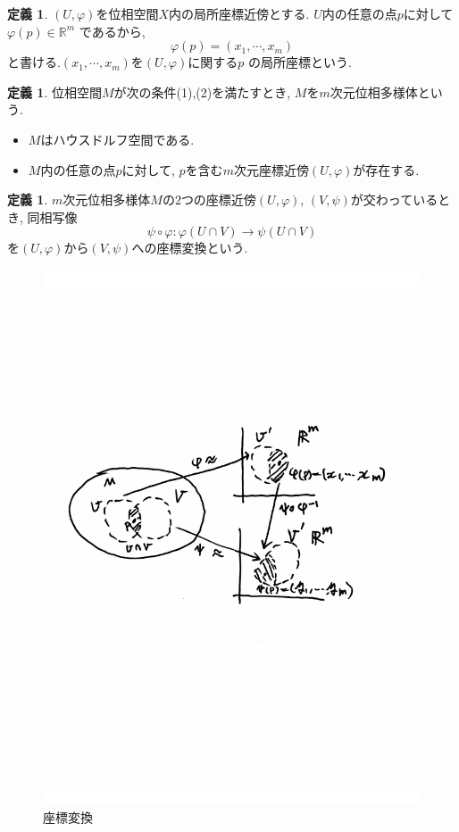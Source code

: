 \documentclass[a4j,12pt]{jarticle}
\theoremstyle{definition}
\newtheorem{definition}[theorem]{定義}
\begin{document}
\begin{definition}
    $(U, \varphi)$を位相空間$X$内の局所座標近傍とする.
    $U$内の任意の点$p$に対して$\varphi(p) \in \mathbb{R}^m$
    であるから, 
    $$\varphi(p)=(x_1, \cdots ,x_m)$$
    と書ける.$(x_1, \cdots ,x_m)$を$(U, \varphi)$に関する$p$
    の局所座標という.
\end{definition}
\begin{definition}
    位相空間$M$が次の条件(1),(2)を満たすとき, 
    $M$を$m$次元位相多様体という. 
    \begin{itemize}
        \item[(1)]$M$はハウスドルフ空間である.
        \item[(2)]$M$内の任意の点$p$に対して, 
        $p$を含む$m$次元座標近傍$(U,\varphi)$が存在する.
    \end{itemize}
\end{definition}
\begin{definition}
    $m$次元位相多様体$M$の$2$つの座標近傍$(U, \varphi)$, 
    $(V, \psi)$が交わっているとき, 同相写像
    $$\psi \circ \varphi:\varphi(U\cap V)\rightarrow \psi(U\cap V)$$
    を$(U, \varphi)$から$(V, \psi)$への座標変換という. 
\end{definition}
\begin{figure}[H]
    \centering
    \includegraphics[keepaspectratio, scale=0.5]{coordinateConversion.pdf}
    \caption{座標変換}
    \label{coordinateConversion}
   \end{figure}
   
\end{document}

